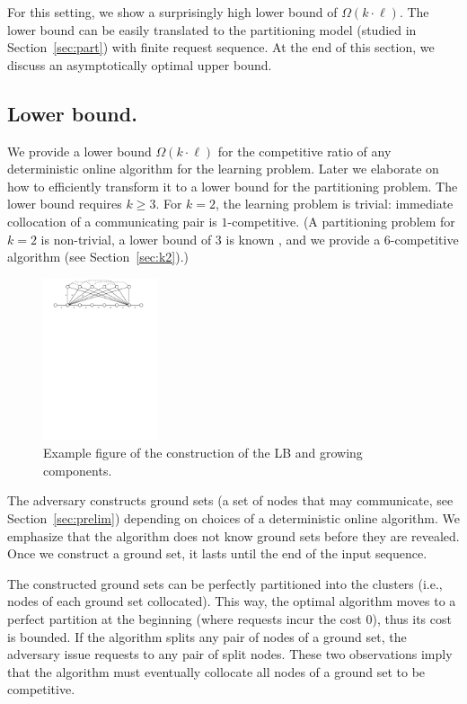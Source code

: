 \documentclass[manuscript,screen=true, review, anonymous]{acmart}
\begin{document}
For this setting, we show a surprisingly high lower bound of $\Omega(k \cdot \ell)$.
The lower bound can be easily translated to the partitioning model (studied in Section~\ref{sec:part}) with finite request sequence.
At the end of this section, we discuss an asymptotically optimal upper bound.


\subsection{Lower bound.}

\label{sec:lowerbound}


We provide a lower bound $\Omega(k\cdot \ell)$ for the competitive ratio of any deterministic online algorithm for the learning problem.
Later we elaborate on how to efficiently transform it to a lower bound for the partitioning problem.
The lower bound requires $k\geq 3$.
For $k=2$, the learning problem is trivial: immediate collocation of a communicating pair is $1$-competitive.
(A partitioning problem for $k=2$ is non-trivial, a lower bound of $3$ is known \cite{repartition-disc}, and we provide a $6$-competitive algorithm (see Section~\ref{sec:k2}).)




\begin{figure}[H]
	\centering
	\includegraphics[width=0.3\textwidth]{figs/substitute}
	\caption{Example figure of the construction of the LB and growing components.}
	\label{fig:nptree-construction}
\end{figure}


The adversary constructs ground sets (a set of nodes that may communicate, see Section~\ref{sec:prelim}) depending on choices of a deterministic online algorithm.
We emphasize that the algorithm does not know ground sets before they are revealed.
Once we construct a ground set, it lasts until the end of the input sequence.

The constructed ground sets can be perfectly partitioned into the clusters (i.e., nodes of each ground set collocated).
This way, the optimal algorithm moves to a perfect partition at the beginning (where requests incur the cost $0$), thus its cost is bounded.
If the algorithm splits any pair of nodes of a ground set, the adversary issue requests to any pair of split nodes.
These two observations imply that the algorithm must eventually collocate all nodes of a ground set to be competitive.
\end{document}
